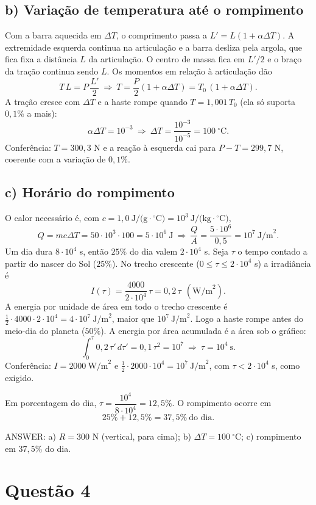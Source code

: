 \documentclass{article}%
\begin{document}
\subsection*{b) Variação de temperatura até o rompimento}
Com a barra aquecida em $\Delta T$, o comprimento passa a $L'=L(1+\alpha\Delta T)$. A extremidade esquerda continua na articulação e a barra desliza pela argola, que fica fixa a distância $L$ da articulação. O centro de massa fica em $L'/2$ e o braço da tração continua sendo $L$. Os momentos em relação à articulação dão
\[
T\,L=P\,\frac{L'}{2}\ \Rightarrow\ T=\frac{P}{2}(1+\alpha\Delta T)=T_0\,(1+\alpha\Delta T).
\]
A tração cresce com $\Delta T$ e a haste rompe quando $T=1{,}001\,T_0$ (ela só suporta $0{,}1\%$ a mais):
\[
\alpha\Delta T=10^{-3}\ \Rightarrow\ \Delta T=\frac{10^{-3}}{10^{-5}}=100\ ^\circ\text{C}.
\]
Conferência: $T=300{,}3$ N e a reação à esquerda cai para $P-T=299{,}7$ N, coerente com a variação de $0{,}1\%$.

\subsection*{c) Horário do rompimento}
O calor necessário é, com $c=1{,}0\ \text{J/(g}\cdot{}^\circ\text{C)}=10^{3}\ \text{J/(kg}\cdot{}^\circ\text{C)}$,
\[
Q=mc\Delta T=50\cdot10^{3}\cdot100=5\cdot10^{6}\ \text{J}
\ \Rightarrow\ \frac{Q}{A}=\frac{5\cdot10^{6}}{0{,}5}=10^{7}\ \text{J/m}^2 .
\]
Um dia dura $8\cdot10^{4}$ s, então $25\%$ do dia valem $2\cdot10^{4}$ s. Seja $\tau$ o tempo contado a partir do nascer do Sol ($25\%$). No trecho crescente ($0\le\tau\le2\cdot10^{4}$ s) a irradiância é
\[
I(\tau)=\frac{4000}{2\cdot10^{4}}\,\tau=0{,}2\,\tau\ \ (\text{W/m}^2).
\]
A energia por unidade de área em todo o trecho crescente é $\tfrac12\cdot4000\cdot2\cdot10^{4}=4\cdot10^{7}\ \text{J/m}^2$, maior que $10^{7}\ \text{J/m}^2$. Logo a haste rompe antes do meio-dia do planeta ($50\%$). A energia por área acumulada é a área sob o gráfico:
\[
\int_0^{\tau}0{,}2\,\tau'\,d\tau'=0{,}1\,\tau^{2}=10^{7}\ \Rightarrow\ \tau=10^{4}\ \text{s}.
\]
Conferência: $I=2000\ \text{W/m}^2$ e $\tfrac12\cdot2000\cdot10^{4}=10^{7}\ \text{J/m}^2$, com $\tau<2\cdot10^{4}$ s, como exigido.

Em porcentagem do dia, $\tau=\dfrac{10^{4}}{8\cdot10^{4}}=12{,}5\%$. O rompimento ocorre em
\[
25\%+12{,}5\%=37{,}5\%\ \text{do dia}.
\]

\medskip
\noindent ANSWER: a) $R=300$ N (vertical, para cima); b) $\Delta T=100\ ^\circ\text{C}$; c) rompimento em $37{,}5\%$ do dia.%
\newpage%
\section*{Questão 4}
\end{document}
